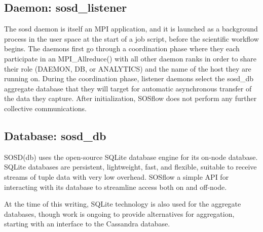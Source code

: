 \subsection{Daemon: sosd\_listener} %
The sosd daemon is itself an MPI application, and it is launched as a
background process in the user space at the start of a job script, before
the scientific workflow begins.
%
The daemons first go through a coordination phase where they each
participate in an MPI\_Allreduce() with all other daemon ranks in
order to share their role (DAEMON, DB, or ANALYTICS) and the name of
the host they are running on.
%
During the coordination phase, listener daemons select the sosd\_db
aggregate database that they will target for automatic asynchronous
transfer of the data they capture.
%
After initialization, SOSflow does not perform any further collective
communications.
%
%

\subsection{Database: sosd\_db} %
%
SOSD(db) uses the open-source SQLite database engine for its on-node
database.
%
SQLite databases are persistent, lightweight, fast, and flexible, suitable to receive
streams of tuple data with very low overhead.
%
SOSflow a simple API for interacting with its database to streamline
access both on and off-node.
%
\par
%
At the time of this writing, SQLite technology is also used for the
aggregate databases, though work is ongoing to provide alternatives
for aggregation, starting with an interface to the Cassandra database.
%
%

